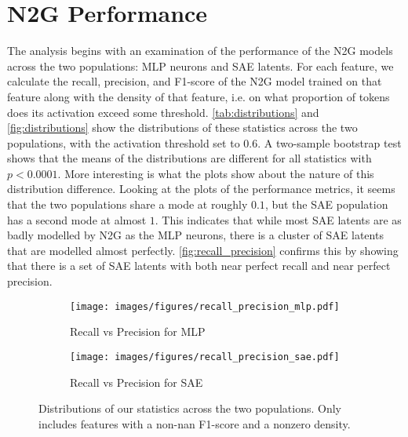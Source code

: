 \section{N2G Performance}
The analysis begins with an examination of the performance of the \ac{N2G} models across the two populations: \ac{MLP} neurons and \ac{SAE} latents.
For each feature, we calculate the recall, precision, and F1-score of the \ac{N2G} model trained on that feature along with the density of that feature, i.e. on what proportion of tokens does its activation exceed some threshold.
\autoref{tab:distributions} and \autoref{fig:distributions} show the distributions of these statistics across the two populations, with the activation threshold set to $0.6$.
A two-sample bootstrap test shows that the means of the distributions are different for all statistics with $p<0.0001$.
More interesting is what the plots show about the nature of this distribution difference.
Looking at the plots of the performance metrics, it seems that the two populations share a mode at roughly $0.1$, but the \ac{SAE} population has a second mode at almost $1$.
This indicates that while most \ac{SAE} latents are as badly modelled by \ac{N2G} as the \ac{MLP} neurons, there is a cluster of \ac{SAE} latents that are modelled almost perfectly.
\autoref{fig:recall_precision} confirms this by showing that there is a set of \ac{SAE} latents with both near perfect recall and near perfect precision.

\begin{figure}[ht]
    \centering
    
    \begin{subfigure}[b]{0.45\textwidth}
        \centering
        \texttt{[image: images/figures/recall\_precision\_mlp.pdf]}
        \caption{Recall vs Precision for \ac{MLP}}
        \label{fig:recall_precision_mlp}
    \end{subfigure}
    \begin{subfigure}[b]{0.45\textwidth}
        \centering
        \texttt{[image: images/figures/recall\_precision\_sae.pdf]}
        \caption{Recall vs Precision for SAE}
        \label{fig:recall_precision_sae}
    \end{subfigure}
    
    \caption{Distributions of our statistics across the two populations. Only includes features with a non-nan F1-score and a nonzero density.}
    \label{fig:recall_precision}
\end{figure}

